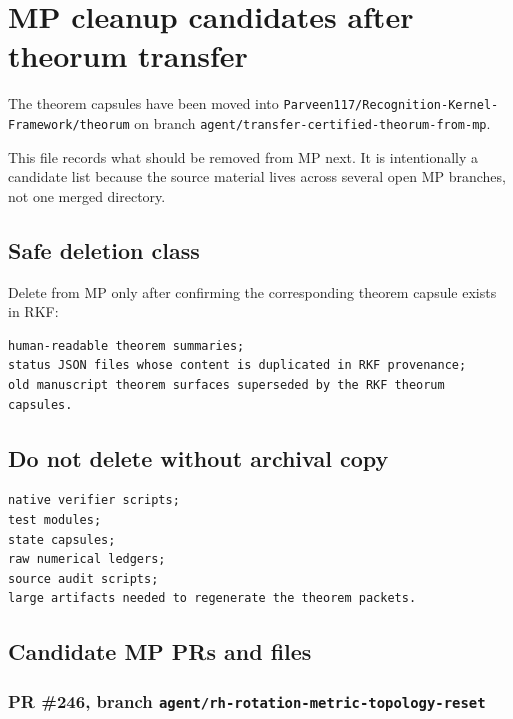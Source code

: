 \hypertarget{mp-cleanup-candidates-after-theorum-transfer}{%
\chapter{MP cleanup candidates after theorum transfer}\label{mp-cleanup-candidates-after-theorum-transfer}}

The theorem capsules have been moved into \texttt{Parveen117/Recognition-Kernel-Framework/theorum} on branch \texttt{agent/transfer-certified-theorum-from-mp}.

This file records what should be removed from MP next. It is intentionally a candidate list because the source material lives across several open MP branches, not one merged directory.

\hypertarget{safe-deletion-class}{%
\section{Safe deletion class}\label{safe-deletion-class}}

Delete from MP only after confirming the corresponding theorem capsule exists in RKF:

\begin{verbatim}
human-readable theorem summaries;
status JSON files whose content is duplicated in RKF provenance;
old manuscript theorem surfaces superseded by the RKF theorum capsules.
\end{verbatim}

\hypertarget{do-not-delete-without-archival-copy}{%
\section{Do not delete without archival copy}\label{do-not-delete-without-archival-copy}}

\begin{verbatim}
native verifier scripts;
test modules;
state capsules;
raw numerical ledgers;
source audit scripts;
large artifacts needed to regenerate the theorem packets.
\end{verbatim}

\hypertarget{candidate-mp-prs-and-files}{%
\section{Candidate MP PRs and files}\label{candidate-mp-prs-and-files}}

\hypertarget{pr-246-branch-agentrh-rotation-metric-topology-reset}{%
\subsection{\texorpdfstring{PR \#246, branch \texttt{agent/rh-rotation-metric-topology-reset}}{PR \#246, branch agent/rh-rotation-metric-topology-reset}}\label{pr-246-branch-agentrh-rotation-metric-topology-reset}}

